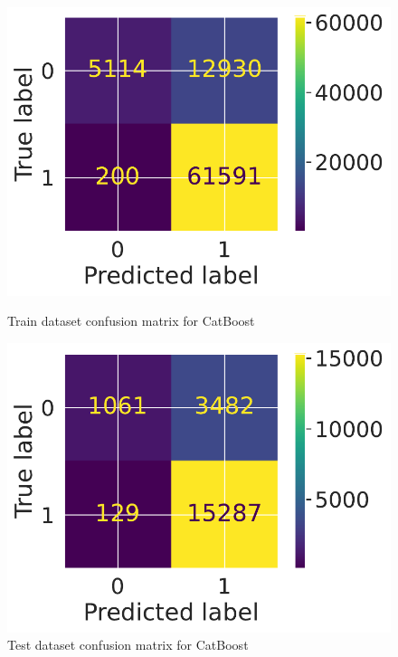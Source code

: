 \documentclass[12pt]{article}
\begin{document}
\begin{figure}
\centering
    \begin{minipage}{0.45\textwidth}
      \centering
      \includegraphics[width=.9\linewidth]{images/catboost_confusion_matrix_train.pdf}
      \caption{Train dataset confusion matrix for CatBoost}
      \label{fig:cm_catboost_train}
    \end{minipage} \hfill
    \begin{minipage}{0.45\textwidth}
      \centering
      \includegraphics[width=.9\linewidth]{images/catboost_confusion_matrix_test.pdf}
      \caption{Test dataset confusion matrix for CatBoost}
      \label{fig:cm_catboost_test}
    \end{minipage}
\end{figure}
\end{document}

